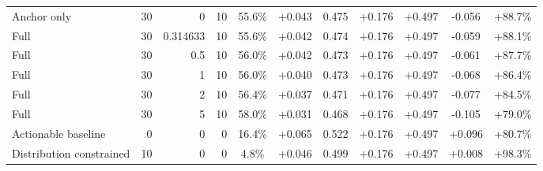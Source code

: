 \begin{table}[htbp]
\begin{tabular}{lrrrccccccc}
Anchor only & 30 & 0 & 10 & 55.6\% & +0.043 & 0.475 & +0.176 & +0.497 & -0.056 & +88.7\% \\
Full & 30 & 0.314633 & 10 & 55.6\% & +0.042 & 0.474 & +0.176 & +0.497 & -0.059 & +88.1\% \\
Full & 30 & 0.5 & 10 & 56.0\% & +0.042 & 0.473 & +0.176 & +0.497 & -0.061 & +87.7\% \\
Full & 30 & 1 & 10 & 56.0\% & +0.040 & 0.473 & +0.176 & +0.497 & -0.068 & +86.4\% \\
Full & 30 & 2 & 10 & 56.4\% & +0.037 & 0.471 & +0.176 & +0.497 & -0.077 & +84.5\% \\
Full & 30 & 5 & 10 & 58.0\% & +0.031 & 0.468 & +0.176 & +0.497 & -0.105 & +79.0\% \\
Actionable baseline & 0 & 0 & 0 & 16.4\% & +0.065 & 0.522 & +0.176 & +0.497 & +0.096 & +80.7\% \\
Distribution constrained & 10 & 0 & 0 & 4.8\% & +0.046 & 0.499 & +0.176 & +0.497 & +0.008 & +98.3\% \\
\bottomrule
\end{tabular}
\end{table}